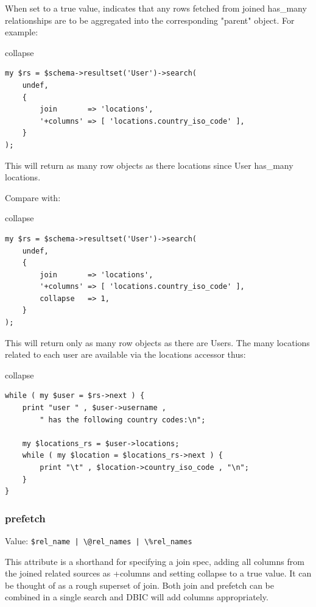 When set to a true value, indicates that any rows fetched from joined
has\_many relationships are to be aggregated into the corresponding "parent"
object. For example:

\begin{frame}[fragile]{collapse}
\begin{lstlisting}
my $rs = $schema->resultset('User')->search(
    undef,
    {
        join       => 'locations',
        '+columns' => [ 'locations.country_iso_code' ],
    }
);
\end{lstlisting}
\end{frame}

This will return as many row objects as there locations since User has\_many
locations.

Compare with:

\begin{frame}[fragile]{collapse}
\begin{lstlisting}
my $rs = $schema->resultset('User')->search(
    undef,
    {
        join       => 'locations',
        '+columns' => [ 'locations.country_iso_code' ],
        collapse   => 1,
    }
);
\end{lstlisting}
\end{frame}

This will return only as many row objects as there are Users. The many locations related to each user are available via the locations accessor thus:

\begin{frame}[fragile]{collapse}
\begin{lstlisting}
while ( my $user = $rs->next ) {
    print "user " , $user->username ,
        " has the following country codes:\n";

    my $locations_rs = $user->locations;
    while ( my $location = $locations_rs->next ) {
        print "\t" , $location->country_iso_code , "\n";
    }
}
\end{lstlisting}
\end{frame}

\subsubsection{prefetch}

Value: \verb=$rel_name | \@rel_names | \%rel_names=

This attribute is a shorthand for specifying a join spec, adding all columns
from the joined related sources as +columns and setting collapse to a true
value. It can be thought of as a rough superset of join. Both join and
prefetch can be combined in a single search and DBIC will add columns
appropriately.

